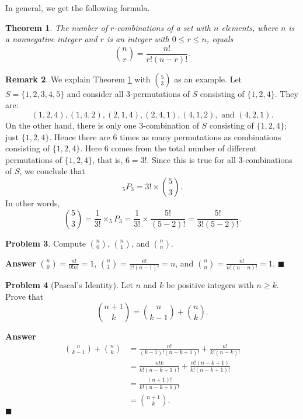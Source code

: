 \documentclass[12pt,letterpaper]{book}
\numberwithin{equation}{section}
\newtheorem{thm}{\textbf{Theorem}}[section]
\theoremstyle{definition}
\newtheorem{problem}[thm]{\textbf{Problem}}
\newtheorem{remark}[thm]{\textbf{Remark}}
\newenvironment{answer}{\noindent\textbf{Answer}}{\hfill$\blacksquare$\vspace{0.1in}}
\begin{document}
In general, we get the following formula.

\begin{thm}\label{formula for combination} The number of $r$-combinations of a set with $n$ elements, where $n$ is a nonnegative integer and $r$ is an integer with $0\leq r\leq n$, equals $${n\choose r}=\frac{n!}{r!(n-r)!}.$$
\end{thm}

\begin{remark} We explain Theorem \ref{formula for combination} with $5 \choose 3$ as an example. Let $S=\{1,2,3,4,5\}$ and consider all 3-permutations of $S$ consisting of $\{1,2,4\}$. They are: $$(1,2,4),(1,4,2),(2,1,4),(2,4,1),(4,1,2),\text{ and } (4,2,1).$$
On the other hand, there is only one $3$-combination of $S$ consisting of $\{1,2,4\}$; just $\{1,2,4\}$. Hence there are 6 times as many permutations as combinations consisting of $\{1,2,4\}$. Here $6$ comes from the total number of different permutations of $\{1,2,4\}$, that is, $6=3!$. Since this is true for all $3$-combinations of $S$, we conclude that
$$_5P_3=3!\times {5 \choose 3}.$$
In other words, $${5\choose 3}=\frac{1}{3!}\times _5P_3=\frac{1}{3!}\times\frac{5!}{(5-2)!}=\frac{5!}{3!(5-2)!}.$$
\end{remark}

\begin{problem} Compute ${n \choose 0}$, ${n \choose 1}$, and ${n\choose n}$.
\end{problem}

\begin{answer}
${n \choose 0}=\frac{n!}{0!n!}=1$, ${n \choose 1}=\frac{n!}{1!(n-1)!}=n$, and ${n\choose n}=\frac{n!}{n!(n-n)!}=1$.
\end{answer}

\begin{problem}[Pascal's Identity] Let $n$ and $k$ be positive integers with $n\geq k$. Prove that
$${n+1 \choose k}={n \choose k-1} + {n \choose k}.$$
\end{problem}

\begin{answer}
\begin{align*}
{n \choose k-1} + {n \choose k}&=\frac{n!}{(k-1)!(n-k+1)!}+\frac{n!}{k!(n-k)!}\\
&=\frac{n!k}{k!(n-k+1)!}+\frac{n!(n-k+1)}{k!(n-k+1)!}\\
&=\frac{(n+1)!}{k!(n-k+1)!}\\
&={n+1 \choose k}.
\end{align*}
\end{answer}
\end{document}
